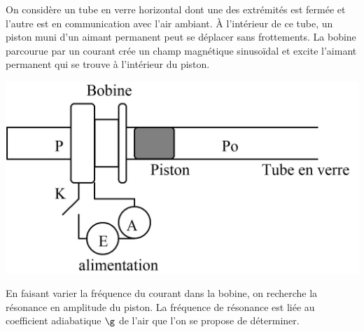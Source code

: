 \documentclass[../main/main.tex]{subfiles}
\begin{document}
{	\noindent
	\begin{minipage}{0.56\linewidth}
		On considère un tube en verre horizontal dont une des extrémités est fermée
		et l'autre est en communication avec l'air ambiant. À l'intérieur de ce
		tube, un piston muni d'un aimant permanent peut se déplacer sans
		frottements. La bobine parcourue par un courant crée un champ magnétique
		sinusoïdal et excite l'aimant permanent qui se trouve à l'intérieur du
		piston.
	\end{minipage}
	\hfill
	\begin{minipage}{0.40\linewidth}
		\begin{center}
			\includegraphics[width=\linewidth]{gamma1}
		\end{center}
	\end{minipage}
	En faisant varier la fréquence du courant dans la bobine, on recherche la
	résonance en amplitude du piston. La fréquence de résonance est liée au
	coefficient adiabatique $\g$ de l'air que l'on se propose de déterminer.

}
\end{document}
